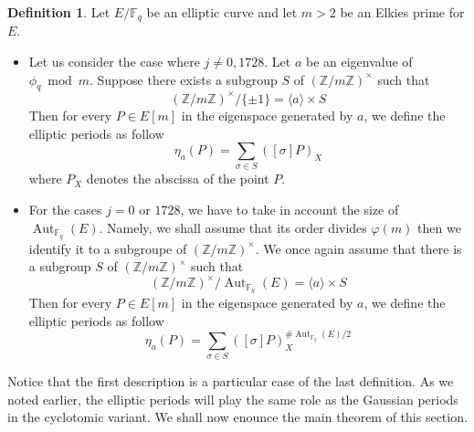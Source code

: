 \documentclass[12pt]{article}
\theoremstyle{plain}
\theoremstyle{definition}
\newtheorem{definition}[theorem]{Definition}
\DeclareMathOperator{\Aut}{Aut}
\def\Z{\ensuremath{\mathbb{Z}}}
\def\F{\ensuremath{\mathbb{F}}}
\begin{document}
\begin{definition}
Let $E/\F_q$ be an elliptic curve and let $m>2$ be an Elkies prime for $E$.\par
\begin{itemize}
\item Let us consider the case where $j\neq0, 1728$. Let $a$ be
an eigenvalue of $\phi_q \bmod m$. Suppose there exists a subgroup $S$ of
$(\Z/m\Z)^{\times}$ such that 
\begin{equation}
(\Z/m\Z)^{\times}/\lbrace{\pm1}\rbrace = \langle{a}\rangle \times S
\end{equation}
Then for every $P\in E[m]$ in the eigenspace generated by $a$, we define
the elliptic periods as follow
\begin{equation}
\eta_{a}(P) = \sum_{\sigma\in S}{\left([\sigma]P\right)_X}
\end{equation}
where $P_X$ denotes the abscissa of the point $P$.\par
     
\item For the cases $j = 0$ or $1728$, we have to take in account the size
of $\Aut_{\F_q}(E)$. Namely, we shall assume that its order divides $\varphi(m)$
then we identify it to a subgroupe of $(\Z/m\Z)^{\times}$. We once again assume
that there is a subgroup $S$ of $(\Z/m\Z)^{\times}$ such that
\begin{equation}
(\Z/m\Z)^{\times}/\Aut_{\F_q}(E) = \langle{a}\rangle\times S
\end{equation}
Then for every $P\in E[m]$ in the eigenspace generated by $a$, we define
the elliptic periods as follow
\begin{equation}
\eta_{a}(P) = \sum_{\sigma\in
S}{\left([\sigma]P\right)_X^{\#\Aut_{\F_q}(E)/2}}
\end{equation}\par
\end{itemize}

\end{definition}

Notice that the first description is a particular case of the last definition.
As we noted earlier, the elliptic periods will play the same role as the
Gaussian periods in the cyclotomic variant. We shall now enounce the main
theorem of this section.
\end{document}
